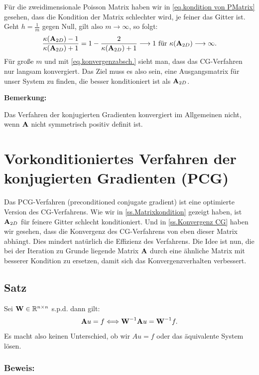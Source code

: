 Für die zweidimensionale Poisson Matrix haben wir in \autoref{eq.kondition von PMatrix} gesehen, dass die Kondition der Matrix schlechter wird, je feiner das Gitter ist. Geht $h = \frac{1}{m}$ gegen Null, gilt also $m \longrightarrow \infty$, so folgt:
\begin{equation}
  \frac {\kappa({\textbf{A}}_{2D}) - 1} {\kappa({\textbf{A}}_{2D}) + 1} = 1 - \frac {2} {\kappa({\textbf{A}}_{2D}) + 1} \longrightarrow 1 \textnormal{ für } \kappa({\textbf{A}}_{2D}) \longrightarrow \infty.
\end{equation}
Für große $m$ und mit \autoref{eq.konvergenzabsch.} sieht man, dass das CG-Verfahren nur langsam konvergiert. Das Ziel muss es also sein, eine Ausgangsmatrix für unser System zu finden, die besser konditioniert ist als ${\textbf{A}}_{2D}$. 

\textbf{Bemerkung:}

Das Verfahren der konjugierten Gradienten konvergiert im Allgemeinen nicht, wenn ${\textbf{A}}$ nicht symmetrisch positiv definit ist.

\section{Vorkonditioniertes Verfahren der konjugierten Gradienten (PCG)}\label{s.PCG}

Das PCG-Verfahren (preconditioned conjugate gradient) ist eine optimierte Version des CG-Verfahrens. Wie wir in \autoref{ss.Matrixkondition} gezeigt haben, ist ${\textbf{A}}_{2D}$ für feinere Gitter schlecht konditioniert. Und in \autoref{ss.Konvergenz CG} haben wir gesehen, dass die Konvergenz des CG-Verfahrens von eben dieser Matrix abhängt. Dies mindert natürlich die Effizienz des Verfahrens. Die Idee ist nun, die bei der Iteration zu Grunde liegende Matrix ${\textbf{A}}$ durch eine ähnliche Matrix mit besserer Kondition zu ersetzen, damit sich das Konvergenzverhalten verbessert.

\subsection{Satz}

Sei ${\textbf{W}} \in \mathbb{R}^{n \times n}$ s.p.d. dann gilt:
\begin{equation}
{\textbf{A}}u = f \Longleftrightarrow {\textbf{W}}^{-1} {\textbf{A}} u = {\textbf{W}}^{-1} f.
\end{equation}
Es macht also keinen Unterschied, ob wir $Au = f$ oder das äquivalente System lösen.

\subsubsection{Beweis:}

